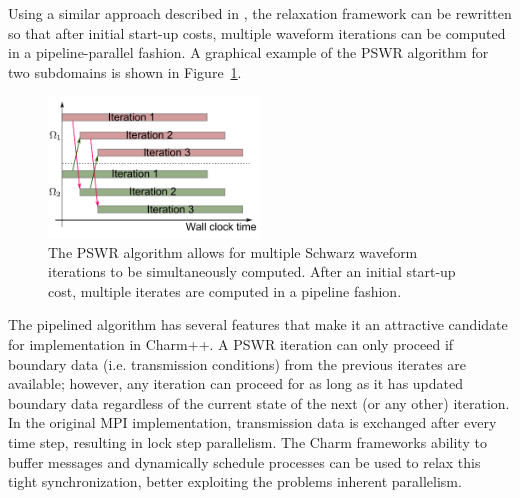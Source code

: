 \documentclass{svmult-ddm}
\begin{document}
Using a similar approach described in
\cite{ChristliebMacdonaldOng2010,MR1340665}, the relaxation framework can be
rewritten so that after initial start-up costs, multiple waveform
iterations can be computed in a pipeline-parallel fashion. A graphical
example of the PSWR algorithm for two subdomains is shown in
Figure~\ref{prop_sec:pswr_fig}.
\begin{figure}
  \centering
  \includegraphics[width=0.5\textwidth]{figure1}
  \caption{The PSWR algorithm allows for multiple Schwarz waveform
    iterations to be simultaneously computed.  After an initial
    start-up cost, multiple iterates are computed in a pipeline
    fashion.}
  \label{prop_sec:pswr_fig}
\end{figure}

The pipelined algorithm has several features that make it an
attractive candidate for implementation in Charm++.  A PSWR iteration
can only proceed if boundary data (i.e. transmission conditions) from
the previous iterates are available; however, any iteration can
proceed for as long as it has updated boundary data regardless of the
current state of the next (or any other) iteration. In the original
MPI implementation, transmission data is exchanged after every time
step, resulting in lock step parallelism. The Charm frameworks ability
to buffer messages and dynamically schedule processes can be used to
relax this tight synchronization, better exploiting the problems
inherent parallelism.
\end{document}
